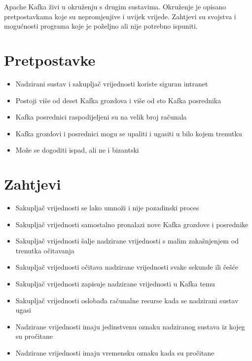 \documentclass[utf8, diplomski, lmodern, numeric]{fer}
\begin{document}
Apache Kafka živi u okruženju s drugim sustavima. Okruženje je opisano pretpostavkama koje su nepromjenjive i uvijek vrijede. Zahtjevi su svojstva i mogućnosti programa koje je poželjno ali nije potrebno ispuniti.


\section{Pretpostavke}

\begin{itemize}
    \item Nadzirani sustav i sakupljač vrijednosti koriste siguran intranet
    \item Postoji više od deset Kafka grozdova i više od sto Kafka posrednika
    \item Kafka posrednici raspodijeljeni su na velik broj računala
    \item Kafka grozdovi i posrednici mogu se upaliti i ugasiti u bilo kojem trenutku
    \item Može se dogoditi ispad, ali ne i bizantski
\end{itemize}


\section{Zahtjevi}

\begin{itemize}
    \item Sakupljač vrijednosti se lako umnoži i nije pozadinski proces
    \item Sakupljač vrijednosti samostalno pronalazi nove Kafka grozdove i posrednike
    \item Sakupljač vrijednosti šalje nadzirane vrijednosti s malim zakašnjenjem od trenutka očitavanja
    \item Sakupljač vrijednosti očitava nadzirane vrijednosti svake sekunde ili češće
    \item Sakupljač vrijednosti zapisuje nadzirane vrijednosti u Kafka temu
    \item Sakupljač vrijednosti oslobađa računalne resurse kada se nadzirani sustav ugasi
    \item Nadzirane vrijednosti imaju jedinstvenu oznaku nadziranog sustava iz kojeg su pročitane
    \item Nadzirane vrijednosti imaju vremensku oznaku kada su pročitane
\end{itemize}
\end{document}
